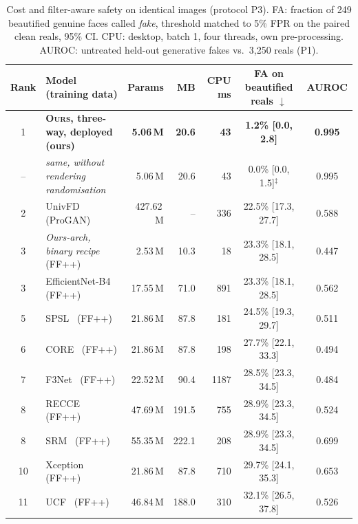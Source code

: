 \documentclass[conference]{IEEEtran}
\newcommand{\ours}{\textsc{Ours}}
\newcommand{\win}[1]{\textbf{#1}}
\begin{document}
\begin{table}[t]
\caption{Cost and filter-aware safety on identical images (protocol P3). FA: fraction of 249
beautified genuine faces called \emph{fake}, threshold matched to 5\% FPR on the paired clean
reals, 95\% CI. CPU: desktop, batch 1, four threads, own pre-processing. AUROC: untreated
held-out generative fakes vs.\ 3{,}250 reals (P1).}
\label{tab:main}
\centering\small
\begin{tabular}{@{}clrrrcc@{}}
\toprule
Rank & Model (training data) & Params & MB & CPU ms & FA on beautified reals $\downarrow$ & AUROC \\
\midrule
1 & \textbf{\ours{}, three-way, deployed (ours)} & \win{5.06\,M} & \win{20.6} & \win{43} & \win{1.2\% [0.0, 2.8]} & \win{0.995} \\
-- & \quad\emph{same, without rendering randomisation} & 5.06\,M & 20.6 & 43 & 0.0\% [0.0, 1.5]$^{\ddagger}$ & 0.995 \\
\midrule
2 & UnivFD~\cite{ojha2023} (ProGAN)    & 427.62\,M & --    & 336  & 22.5\% [17.3, 27.7] & 0.588 \\
3 & \emph{Ours-arch, binary recipe} (FF++) & 2.53\,M & 10.3 & 18 & 23.3\% [18.1, 28.5] & 0.447 \\
3 & EfficientNet-B4 (FF++)              & 17.55\,M  & 71.0  & 891  & 23.3\% [18.1, 28.5] & 0.562 \\
5 & SPSL~\cite{liu2021} (FF++)          & 21.86\,M  & 87.8  & 181  & 24.5\% [19.3, 29.7] & 0.511 \\
6 & CORE~\cite{ni2022} (FF++)           & 21.86\,M  & 87.8  & 198  & 27.7\% [22.1, 33.3] & 0.494 \\
7 & F3Net~\cite{qian2020} (FF++)        & 22.52\,M  & 90.4  & 1187 & 28.5\% [23.3, 34.5] & 0.484 \\
8 & RECCE~\cite{cao2022} (FF++)         & 47.69\,M  & 191.5 & 755  & 28.9\% [23.3, 34.5] & 0.524 \\
8 & SRM~\cite{luo2021} (FF++)           & 55.35\,M  & 222.1 & 208  & 28.9\% [23.3, 34.5] & 0.699 \\
10 & Xception~\cite{rossler2019} (FF++) & 21.86\,M  & 87.8  & 710  & 29.7\% [24.1, 35.3] & 0.653 \\
11 & UCF~\cite{yan2023ucf} (FF++)       & 46.84\,M  & 188.0 & 310  & 32.1\% [26.5, 37.8] & 0.526 \\

\end{tabular}
\end{table}
\end{document}
